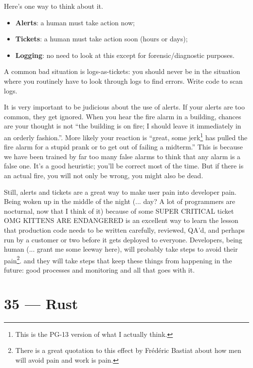 \documentclass[a4paper]{report}
\begin{document}
Here's one way to think about it. 
\begin{itemize}
\item {\bf Alerts}: a human must take action now;
\item {\bf Tickets}: a human must take action soon (hours or days);
\item {\bf Logging}: no need to look at this except for forensic/diagnostic purposes.
\end{itemize}
A common bad situation is logs-as-tickets: you should never be in the
situation where you routinely have to look through logs to find
errors. Write code to scan logs.

It is very important to be judicious about the use of alerts. If your alerts are too common, they get ignored. When you hear the fire alarm in a building, chances are your thought is not ``the building is on fire; I should leave it immediately in an orderly fashion.''. More likely your reaction is ``great, some jerk\footnote{This is the PG-13 version of what I actually think.} has pulled the fire alarm for a stupid prank or to get out of failing a midterm.'' This is because we have been trained by far too many false alarms to think that any alarm is a false one. It's a good heuristic; you'll be correct most of the time. But if there is an actual fire, you will not only be wrong, you might also be dead.

Still, alerts and tickets are a great way to make user pain into developer pain. Being woken up in the middle of the night (... day? A lot of programmers are nocturnal, now that I think of it) because of some SUPER CRITICAL ticket OMG KITTENS ARE ENDANGERED is an excellent way to learn the lesson that production code needs to be written carefully, reviewed, QA'd, and perhaps run by a customer or two before it gets deployed to everyone. Developers, being human (... grant me some leeway here), will probably take steps to avoid their pain\footnote{There is a great quotation to this effect by Fr\'ed\'eric Bastiat about how men will avoid pain and work is pain.}. and they will take steps that keep these things from happening in the future: good processes and monitoring and all that goes with it.










\chapter*{35 --- Rust}
\end{document}
